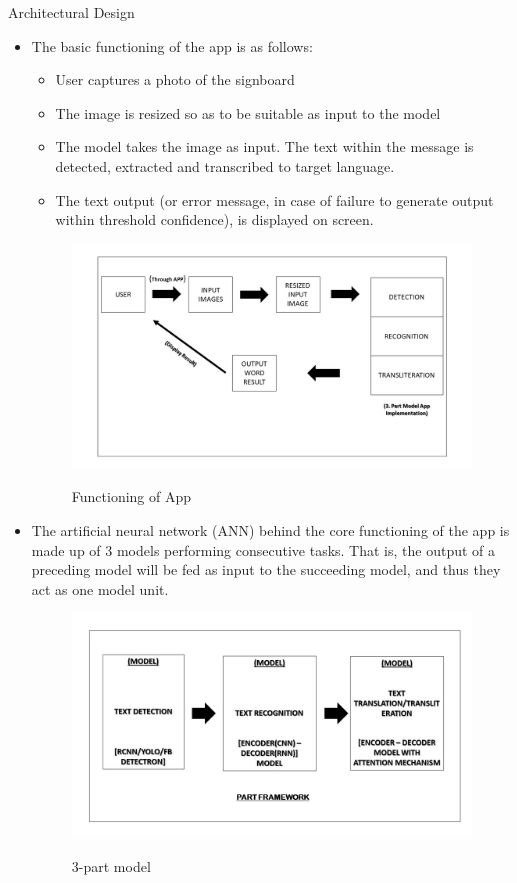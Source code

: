 \documentclass{beamer}
\begin{document}
	\begin{frame}[allowframebreaks]{Architectural Design}
	\begin{itemize}
		\item The basic functioning of the app is as follows:
		\begin{itemize}
			\item User captures a photo of the signboard
			\item The image is resized so as to be suitable as input to the model
			\item The model takes the image as input. The text within the message is detected, extracted and transcribed to target language.
			\item The text output (or error message, in case of failure to generate output within threshold confidence), is displayed on screen.
		\end{itemize}
		 \begin{figure}
				{\includegraphics[scale=.3]{Slide2}}
				\caption{Functioning of App}
				\label{Slide2}
		\end{figure}
		\item The artificial neural network (ANN) behind the core functioning of the app is made up of 3 models performing consecutive tasks. That is, the output of a preceding model will be fed as input to the succeeding model, and thus they act as one model unit.
		\begin{figure}
				{\includegraphics[scale=.3]{Slide1}}
				\caption{3-part model}
				\label{Slide1}
		\end{figure}
	\end{itemize}
\end{frame}
\end{document}
